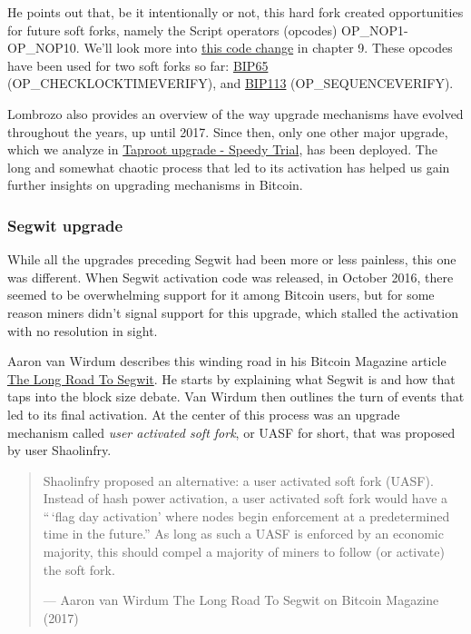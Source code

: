 He points out that, be it intentionally or not, this hard fork created
opportunities for future soft forks, namely the Script operators
(opcodes) OP\_NOP1-OP\_NOP10. We'll look more into
\protect\hyperlink{cve-2010-5141}{this code change} in chapter 9. These
opcodes have been used for two soft forks so far:
\href{https://github.com/bitcoin/bips/blob/master/bip-0065.mediawiki}{BIP65}
(OP\_CHECKLOCKTIMEVERIFY), and
\href{https://github.com/bitcoin/bips/blob/master/bip-0112.mediawiki}{BIP113}
(OP\_SEQUENCEVERIFY).

Lombrozo also provides an overview of the way upgrade mechanisms have
evolved throughout the years, up until 2017. Since then, only one other
major upgrade, which we analyze in
\protect\hyperlink{taproot-deployment}{Taproot upgrade - Speedy Trial},
has been deployed. The long and somewhat chaotic process that led to its
activation has helped us gain further insights on upgrading mechanisms
in Bitcoin.

\hypertarget{segwit-upgrade}{%
\subsubsection{Segwit upgrade}\label{segwit-upgrade}}

While all the upgrades preceding Segwit had been more or less painless,
this one was different. When Segwit activation code was released, in
October 2016, there seemed to be overwhelming support for it among
Bitcoin users, but for some reason miners didn't signal support for this
upgrade, which stalled the activation with no resolution in sight.

Aaron van Wirdum describes this winding road in his Bitcoin Magazine
article
\href{https://bitcoinmagazine.com/technical/the-long-road-to-segwit-how-bitcoins-biggest-protocol-upgrade-became-reality}{The
Long Road To Segwit}. He starts by explaining what Segwit is and how
that taps into the block size debate. Van Wirdum then outlines the turn
of events that led to its final activation. At the center of this
process was an upgrade mechanism called \emph{user activated soft fork},
or UASF for short, that was proposed by user Shaolinfry.

\begin{quote}
Shaolinfry proposed an alternative: a user activated soft fork (UASF).
Instead of hash power activation, a user activated soft fork would have
a ``\,`flag day activation' where nodes begin enforcement at a
predetermined time in the future.'' As long as such a UASF is enforced
by an economic majority, this should compel a majority of miners to
follow (or activate) the soft fork.

---  Aaron van Wirdum The Long Road To Segwit on Bitcoin Magazine (2017)
\end{quote}

